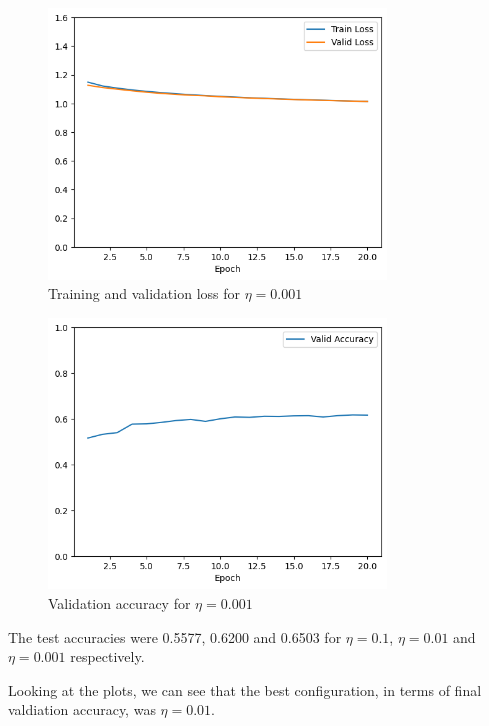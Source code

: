 \documentclass{article}
\begin{document}
\begin{figure}[H]
    \centering
    \includegraphics[width=0.8\textwidth]{"plots/logistic_regression-training-loss-batch-16-lr-0.001-epochs-20-l2-0-opt-sgd.png"}
    \caption{Training and validation loss for $\eta = 0.001$}
    \label{2.1 0.001 Loss Plot}
\end{figure}

\begin{figure}[H]
    \centering
    \includegraphics[width=0.8\textwidth]{"plots/logistic_regression-validation-accuracy-batch-16-lr-0.001-epochs-20-l2-0-opt-sgd.png"}
    \caption{Validation accuracy for $\eta = 0.001$}
    \label{2.1 0.001 Acc Plot}
\end{figure}

The test accuracies were 0.5577, 0.6200 and 0.6503 for $\eta = 0.1$, $\eta = 0.01$ and $\eta = 0.001$ respectively.

Looking at the plots, we can see that the best configuration, in terms of final valdiation accuracy, was $\eta = 0.01$.
\end{document}
